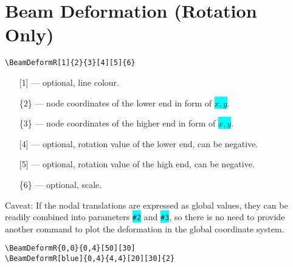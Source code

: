 \documentclass[10pt,a4paper]{article}
\newcommand*{\Highlight}[1]{\colorbox{cyan}{\color{red}\texttt{#1}}}
\begin{document}
\section{Beam Deformation (Rotation Only)}
\begin{Verbatim}[frame=single,label=Syntax]
\BeamDeformR[1]{2}{3}[4][5]{6}
\end{Verbatim}
\begin{enumerate}
\item[][1] --- optional, line colour.
\item[]\{2\} --- node coordinates of the lower end in form of \Highlight{$x,y$}.
\item[]\{3\} --- node coordinates of the higher end in form of \Highlight{$x,y$}.
\item[][4] --- optional, rotation value of the lower end, can be negative.
\item[][5] --- optional, rotation value of the high end, can be negative.
\item[]\{6\} --- optional, scale.
\end{enumerate}
Caveat: If the nodal translations are expressed as global values, they can be readily combined into parameters \Highlight{\#2} and \Highlight{\#3}, so there is no need to provide another command to plot the deformation in the global coordinate system.
\begin{Verbatim}[frame=single,label=Example]
\BeamDeformR{0,0}{0,4}[50][30]
\BeamDeformR[blue]{0,4}{4,4}[20][30]{2}
\end{Verbatim}
\begin{figure}[H]
\centering
{}
\end{figure}
\end{document}
